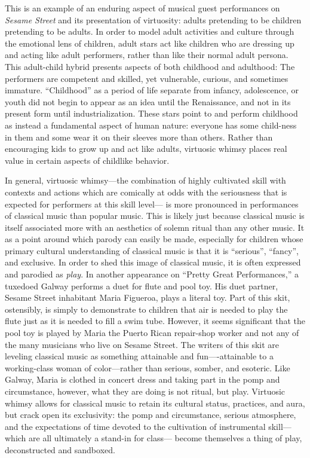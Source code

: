 \documentclass[12pt,letterpaper]{article}
\begin{document}
	This is an example of an enduring aspect of musical guest performances
	on \textit{Sesame Street} and its presentation of virtuosity: adults 
	pretending to be children pretending
	to be adults. In order to model adult activities and culture through the
	emotional lens of children, adult stars act like children who are 
	dressing up and acting like adult performers, rather than like their
	normal adult persona. This adult-child hybrid 
	presents aspects of both childhood and adulthood: The performers are 
	competent and skilled, yet vulnerable, curious, and sometimes immature.  
	``Childhood'' as a period of life separate from infancy, adolescence, 
	or youth did not begin to appear as an idea until the Renaissance, and
	not in its present form until industrialization.\autocite[13]{Illich}
	These stars point to and perform childhood as instead a fundamental 
	aspect of human nature: everyone has some child-ness in them and some
	wear it on their sleeves more than others. Rather than encouraging
	kids to grow up and act like adults, virtuosic whimsy places real value
	in certain aspects of childlike behavior.

	In general, virtuosic whimsy---the combination of highly cultivated
	skill with contexts and actions which are comically at odds with the
	seriousness that is expected for performers at this skill level--- is 
	more pronounced in performances	of classical music than popular music.
	This is likely just because classical music is itself associated more
	with an aesthetics of solemn ritual than any other music. It as a point
	around which parody can easily be made, especially for children whose
	primary cultural understanding of classical music is that it is 
	``serious'', ``fancy'', and 
	exclusive. In order to shed this image of classical music, it is often 
	expressed and parodied as \textit{play}. In another appearance on 
	``Pretty Great Performances,'' a tuxedoed Galway performs a duet for 
	flute and pool toy.\autocite{Galway1} His duet partner, Sesame 
	Street inhabitant Maria Figueroa,\autocite{Maria} plays a literal toy. 
	Part of this skit, ostensibly, is simply to demonstrate to children that
	air is needed to play the flute just as it is needed to fill a swim 
	tube. However, it seems significant that the pool toy is played by Maria
	the Puerto Rican repair-shop worker and not any of the many musicians 
	who live on Sesame Street. The writers of this skit are leveling 
	classical music as something attainable and fun----attainable to a 
	working-class woman of color---rather than serious, somber, and 
	esoteric. Like Galway, Maria is clothed in concert dress and taking part
	in the pomp and circumstance, however, what they are doing is not 
	ritual, but play. Virtuosic whimsy allows for classical music to retain 
	its cultural status, practices, and aura, but crack open its 
	exclusivity: the pomp and circumstance, serious atmosphere, 
	and the expectations of time devoted to the cultivation of instrumental
	skill---which are all ultimately a stand-in for 
	class---\autocite[7]{Bull} become themselves a thing of play, 
	deconstructed and sandboxed. 
\end{document}
